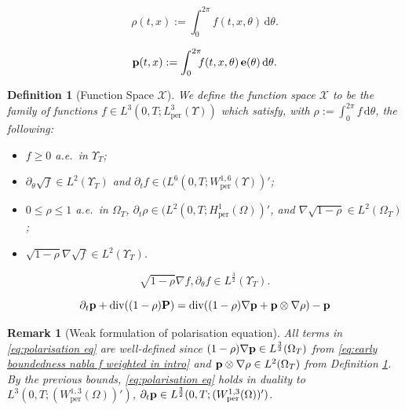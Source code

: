 \documentclass[10pt,a4paper]{amsart}
\newtheorem{definition}{Definition}
\newtheorem{rem}{Remark}
\renewcommand{\P}{{\bf P}}
\renewcommand{\d}{\, \mathrm{d} }
\DeclareMathOperator{\dv}{div}
\newcommand{\e}{{\bf e}}
\newcommand{\p}{{\bf p}}
\newcommand{\per}{\mathrm{per}}
\begin{document}
\begin{equation}\label{eq:rho def}
    \rho(t,x) := \int_0^{2\pi} \!\!\! f(t,x,\theta) \d \theta.
\end{equation}

\begin{equation}\label{eq:polarisation def}
    \p(t,x) := \int_0^{2\pi} \!\!\! f(t,x,\theta) \, \e(\theta) \d \theta. 
\end{equation}

\begin{definition}[Function Space $\mathcal{X}$]\label{def:function space}
   We define the function space $\mathcal{X}$ to be the family of functions $f \in L^3(0,T;L^3_\per(\Upsilon))$ which satisfy, with $\rho := \int_0^{2\pi} f \d \theta$, the following: 
    \begin{itemize}
        \item[(i)] $f \geq 0$ a.e.~in $\Upsilon_T$; 
        \item[(ii)] $\partial_\theta \sqrt{f} \in L^2(\Upsilon_T)$ and $\partial_t f \in (L^6(0,T;W^{1,6}_\per(\Upsilon))'$; 
        \item[(iii)] $0 \leq \rho \leq 1$ a.e.~in $\Omega_T$, $\partial_t \rho \in (L^2(0,T;H^1_\per(\Omega))'$, and $\nabla\sqrt{1-\rho} \in L^2(\Omega_T)$; 
        \item[(iv)] $\sqrt{1-\rho}\nabla\sqrt{f} \in L^2(\Upsilon_T)$. 
    \end{itemize}
\end{definition}

\begin{equation}\label{eq:early boundedness nabla f weighted in intro}
    \sqrt{1-\rho}\nabla f , \partial_\theta f \in L^{\frac{3}{2}}(\Upsilon_T). 
\end{equation}

\begin{equation}\label{eq:polarisation eq}
    \partial_t \p + \dv((1-\rho)\P) = \dv((1-\rho)\nabla \p + \p \otimes \nabla \rho) - \p 
\end{equation}

\begin{rem}[Weak formulation of polarisation equation]\label{rem:sense of p eqn to begin with}
    All terms in \eqref{eq:polarisation eq} are well-defined since $(1-\rho)\nabla \p \in L^{\frac{3}{2}}(\Omega_T)$ from \eqref{eq:early boundedness nabla f weighted in intro} and $\p \otimes \nabla \rho \in L^2(\Omega_T)$ from Definition \ref{def:function space}. By the previous bounds, \eqref{eq:polarisation eq} holds in duality to $L^3(0,T;(W^{1,3}_\per(\Omega))')$, $\partial_t \p \in L^{\frac{3}{2}}(0,T;(W^{1,3}_\per(\Omega))')$. 
\end{rem}
\end{document}
